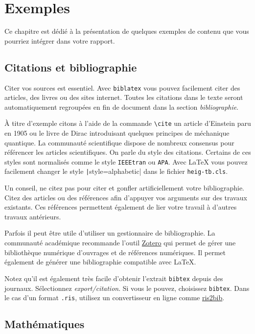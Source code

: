 \chapter{Exemples}

Ce chapitre est dédié à la présentation de quelques exemples de contenu que vous pourriez intégrer dans votre rapport.

\section{Citations et bibliographie}

Citer vos sources est essentiel. Avec \texttt{biblatex} vous pouvez facilement citer des articles, des livres ou des sites internet. Toutes les citations dans le texte seront automatiquement regroupées en fin de document dans la section \emph{bibliographie}.

À titre d'exemple citons à l'aide de la commande \verb!\cite! un article d'Einstein \cite{einstein} paru en 1905 ou le livre de Dirac \cite{dirac} introduisant quelques principes de méchanique quantique. La communauté scientifique dispose de nombreux consensus pour référencer les articles scientifiques. On parle du style des citations. Certains de ces styles sont normalisés comme le style \texttt{IEEEtran} ou \texttt{APA}. Avec \LaTeX{} vous pouvez facilement changer le style \texttt|style=alphabetic| dans le fichier \texttt{heig-tb.cls}.

Un conseil, ne citez pas pour citer et gonfler artificiellement votre bibliographie. Citez des articles ou des références afin d'appuyer vos arguments sur des travaux existants. Ces références permettent également de lier votre travail à d'autres travaux antérieurs.

Parfois il peut être utile d'utiliser un gestionnaire de bibliographie. La communauté académique recommande l'outil \href{https://www.zotero.org/}{Zotero} qui permet de gérer une bibliothèque numérique d'ouvrages et de références numériques. Il permet également de générer une bibliographie compatible avec \LaTeX.

Notez qu'il est également très facile d'obtenir l'extrait \texttt{bibtex} depuis des journaux. Sélectionnez \emph{export/citation}. Si vous le pouvez, choisissez \texttt{bibtex}. Dans le cas d'un format \texttt{.ris}, utilisez un convertisseur en ligne comme \href{http://www.bruot.org/ris2bib/}{ris2bib}.

\section{Mathématiques}

